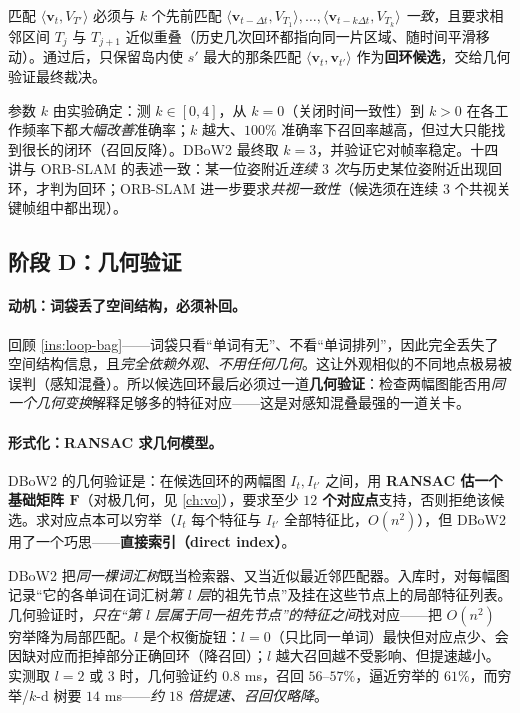 \begin{definition}[时间一致性判据]\label{def:loop-temporal}
匹配 $\langle\boldsymbol v_t,V_{T'}\rangle$ 必须与 $k$ 个先前匹配 $\langle\boldsymbol v_{t-\Delta t},V_{T_1}\rangle,\dots,\langle\boldsymbol v_{t-k\Delta t},V_{T_k}\rangle$ \emph{一致}，且要求相邻区间 $T_j$ 与 $T_{j+1}$ 近似重叠（历史几次回环都指向同一片区域、随时间平滑移动）\cite{galvez2012bags}。通过后，只保留岛内使 $s'$ 最大的那条匹配 $\langle\boldsymbol v_t,\boldsymbol v_{t'}\rangle$ 作为\textbf{回环候选}，交给几何验证最终裁决。
\end{definition}

\noindent 参数 $k$ 由实验确定\cite{galvez2012bags}：测 $k\in[0,4]$，从 $k=0$（关闭时间一致性）到 $k>0$ 在各工作频率下都\emph{大幅改善}准确率；$k$ 越大、$100\%$ 准确率下召回率越高，但过大只能找到很长的闭环（召回反降）。DBoW2 最终取 \textbf{$k=3$}，并验证它对帧率稳定。十四讲与 ORB-SLAM\cite{murartal2015orbslam} 的表述一致：某一位姿附近\emph{连续 $3$ 次}与历史某位姿附近出现回环，才判为回环；ORB-SLAM 进一步要求\emph{共视一致性}（候选须在连续 $3$ 个共视关键帧组中都出现）\cite{gaoxiang2019slam14}。

\subsection{阶段 D：几何验证}
\label{sec:loop-stageD}

\paragraph{动机：词袋丢了空间结构，必须补回。}
回顾 \cref{ins:loop-bag}——词袋只看“单词有无”、不看“单词排列”，因此完全丢失了空间结构信息，且\emph{完全依赖外观、不用任何几何}。这让外观相似的不同地点极易被误判（感知混叠）。所以候选回环最后必须过一道\textbf{几何验证}：检查两幅图能否用\emph{同一个几何变换}解释足够多的特征对应——这是对感知混叠最强的一道关卡。

\paragraph{形式化：RANSAC 求几何模型。}
DBoW2 的几何验证是\cite{galvez2012bags}：在候选回环的两幅图 $I_t,I_{t'}$ 之间，用 \textbf{RANSAC 估一个基础矩阵 $\mathbf F$}（对极几何，见 \cref{ch:vo}），要求至少 \textbf{$12$ 个对应点}支持，否则拒绝该候选。求对应点本可以穷举（$I_t$ 每个特征与 $I_{t'}$ 全部特征比，$O(n^2)$），但 DBoW2 用了一个巧思——\textbf{直接索引（direct index）}。

\begin{insight}\label{ins:loop-direct}
DBoW2 把\emph{同一棵词汇树}既当检索器、又当近似最近邻匹配器\cite{galvez2012bags}。入库时，对每幅图记录“它的各单词在词汇树\emph{第 $l$ 层}的祖先节点”及挂在这些节点上的局部特征列表。几何验证时，\emph{只在“第 $l$ 层属于同一祖先节点”的特征之间}找对应——把 $O(n^2)$ 穷举降为局部匹配。$l$ 是个权衡旋钮：$l=0$（只比同一单词）最快但对应点少、会因缺对应而拒掉部分正确回环（降召回）；$l$ 越大召回越不受影响、但提速越小。实测取 $l=2$ 或 $3$ 时，几何验证约 $0.8$ ms，召回 $56$--$57\%$，逼近穷举的 $61\%$，而穷举/$k$-d 树要 $14$ ms——\emph{约 $18$ 倍提速、召回仅略降}。
\end{insight}

